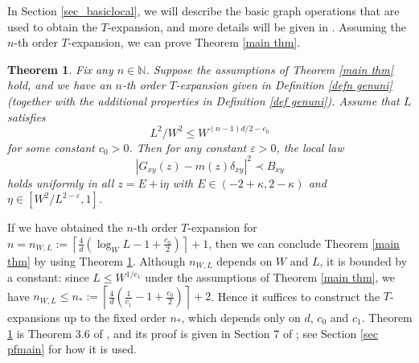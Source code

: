 \documentclass{article}
\newcommand{\1}{\mathds{1}}
\numberwithin{equation}{section}
\newcommand{\be}{\begin{equation}}
\newcommand{\ee}{\end{equation}}
\newcommand{\e}{{\varepsilon}}
\newcommand{\ii}{\mathrm{i}} %
\renewcommand{\leq}{\leqslant}
\renewcommand{\le}{\leq}
\newcommand{\N}{\mathbb{N}}
\newcommand{\self}{\text{self-energy}}
\theoremstyle{plain} %
\newtheorem{theorem}{Theorem}[section]
\newtheorem{lemma}[theorem]{Lemma}
\theoremstyle{remark}
\newcommand{\cor}{\color{red}}
\newcommand{\Sele}{{\mathcal E}}
\begin{document}
In Section \ref{sec_basiclocal}, we will describe the basic graph operations that are used to obtain the $T$-expansion, and more details will  be given in \cite{PartII_high}. Assuming the $n$-th order $T$-expansion, we can prove Theorem \ref{main thm}. %
 
\begin{theorem}\label{thm ptree}
Fix any $n\in \N$. Suppose the assumptions of Theorem \ref{main thm} hold, and we have an $n$-th order $T$-expansion given in Definition \ref{defn genuni} (together with the additional properties in Definition \ref{def genuni}). 
Assume that $L$ satisfies 
\be\label{Lcondition1}  {L^2}/{W^2}  \le W^{(n-1)d/2-c_0} \ee
for some constant $c_0>0$. Then for any constant $\e>0$, the local law %
\be\label{locallaw1}
|G_{xy} (z) -m(z)\delta_{xy}|^2 \prec B_{xy}
\ee
holds uniformly in all $z= E+\ii\eta$ with $E\in (-2+\kappa,2-\kappa)$ and $\eta \in [W^{2}/L^{2-\e},1]$.
\end{theorem}



If we have obtained the $n$-th order $T$-expansion for $n= n_{W,L}:= \left\lceil\frac{4}{d}\left(\log_W L  - 1 + \frac{c_0}{2}\right)\right\rceil+1$, then we can conclude Theorem \ref{main thm} by using Theorem \ref{thm ptree}. Although $n_{W,L}$ depends on $W$ and $L$, it is bounded by a constant: since $L\le W^{1/c_1}$ under the assumptions of Theorem \ref{main thm}, we have $n_{W,L}\le n_*:=\left\lceil\frac{4}{d}\left(\frac{1}{c_1}  - 1 + \frac{c_0}{2}\right)\right\rceil+2$. Hence it suffices to construct the $T$-expansions up to the fixed order $n_*$, which depends only on $d$, $c_0$ and $c_1$. Theorem \ref{thm ptree} is Theorem 3.6 of \cite{PartII_high}, and its proof is given in Section 7 of \cite{PartII_high}; see Section \ref{sec pfmain} for how it is used.



 
\end{document}
